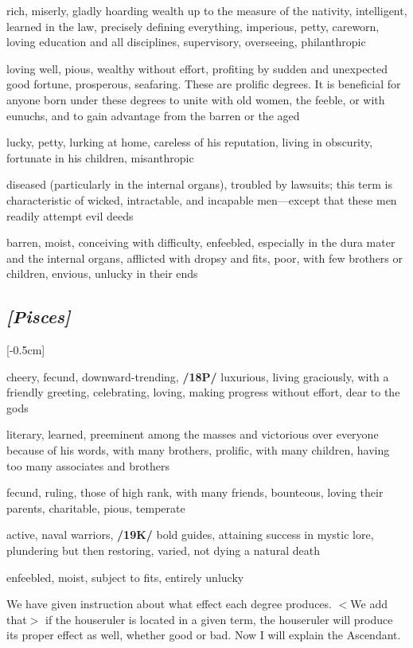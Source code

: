 \begin{description}[labelindent=0em , labelwidth=1em, labelsep=1em, leftmargin =!]
\item[\Mercury]
	[0-6] rich, miserly, gladly hoarding wealth up to the measure of the nativity, intelligent, learned in the law, precisely defining everything, imperious, petty, careworn,
loving education and all disciplines, supervisory, overseeing, philanthropic
\item[\Venus]
	[7-12] loving well, pious, wealthy without effort, profiting by sudden and unexpected good fortune, prosperous,
seafaring. These are prolific degrees. It is beneficial for anyone born under these degrees to unite with old women, the feeble, or with eunuchs, and to gain advantage from the barren or the aged
\item[\Jupiter]
	[13-19] lucky, petty, lurking at home, careless of his reputation, living in obscurity, fortunate in his children, misanthropic
\item[\Mars]
	[20-24] diseased (particularly in the internal organs), troubled
by lawsuits; this term is characteristic of wicked, intractable, and incapable men—except that these men readily attempt evil deeds	
\item[\Saturn]
	[25-29] barren, moist, conceiving with
difficulty, enfeebled, especially in the dura mater and the internal organs, afflicted with dropsy and fits, poor, with few brothers or children, envious, unlucky in their ends
\end{description}

\subsection{\textit{[Pisces]}}
\marginnote{\Pisces}[-0.5cm]
\vspace{-1mm}

\begin{description}[labelindent=0em , labelwidth=1em, labelsep=1em, leftmargin =!]
\item[\Venus]
	[0-11] cheery, fecund, downward-trending, \textbf{/18P/} luxurious, living graciously, with a friendly greeting, celebrating, loving, making progress without effort, dear to the gods
\item[\Jupiter]
	[12-15] literary, learned, preeminent among the masses and victorious over everyone because of his words, with many brothers, prolific, with many children, having too many associates and brothers	
\item[\Mercury]
	[16-18] fecund, ruling, those of high rank, with many friends, bounteous, loving their parents, charitable, pious, temperate	
\item[\Mars]
	[19-27] active, naval warriors, \textbf{/19K/} bold guides, attaining success in mystic lore, plundering but then restoring, varied, not dying a natural death	
\item[\Saturn]
	[28-29] enfeebled, moist, subject to fits, entirely unlucky	
\end{description}

\mndl[0.2cm]
We have given instruction about what effect each degree produces. $<$We add that$>$ if the houseruler is located in a given term, the houseruler will produce its proper effect as well, whether good or bad. Now I will explain the Ascendant.
\newpage
